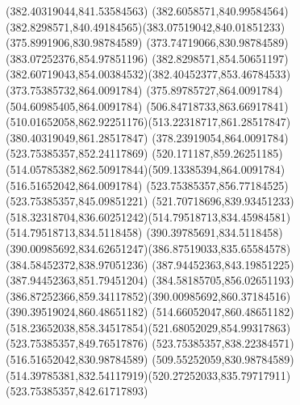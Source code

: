 {{	\closepath
	\moveto(382.40319044,841.53584563)
	\curveto(382.6058571,840.99584564)(382.8298571,840.49184565)(383.07519042,840.01851233)
	\lineto(375.8991906,830.98784589)
	\lineto(373.74719066,830.98784589)
	\closepath
	\moveto(383.07252376,854.97851196)
	\curveto(382.8298571,854.50651197)(382.60719043,854.00384532)(382.40452377,853.46784533)
	\lineto(373.75385732,864.0091784)
	\lineto(375.89785727,864.0091784)
	\closepath
	\moveto(504.60985405,864.0091784)
	\curveto(506.84718733,863.66917841)(510.01652058,862.92251176)(513.22318717,861.28517847)
	\lineto(380.40319049,861.28517847)
	\lineto(378.23919054,864.0091784)
	\closepath
	\moveto(523.75385357,852.24117869)
	\curveto(520.171187,859.26251185)(514.05785382,862.50917844)(509.13385394,864.0091784)
	\lineto(516.51652042,864.0091784)
	\lineto(523.75385357,856.77184525)
	\closepath
	\moveto(523.75385357,845.09851221)
	\curveto(521.70718696,839.93451233)(518.32318704,836.60251242)(514.79518713,834.45984581)
	\lineto(514.79518713,834.5118458)
	\lineto(390.39785691,834.5118458)
	\curveto(390.00985692,834.62651247)(386.87519033,835.65584578)(384.58452372,838.97051236)
	\lineto(387.94452363,843.19851225)
	\lineto(387.94452363,851.79451204)
	\lineto(384.58185705,856.02651193)
	\curveto(386.87252366,859.34117852)(390.00985692,860.37184516)(390.39519024,860.48651182)
	\lineto(514.66052047,860.48651182)
	\curveto(518.23652038,858.34517854)(521.68052029,854.99317863)(523.75385357,849.76517876)
	\closepath
	\moveto(523.75385357,838.22384571)
	\lineto(516.51652042,830.98784589)
	\lineto(509.55252059,830.98784589)
	\curveto(514.39785381,832.54117919)(520.27252033,835.79717911)(523.75385357,842.61717893)
	\closepath
}
}
{
}
